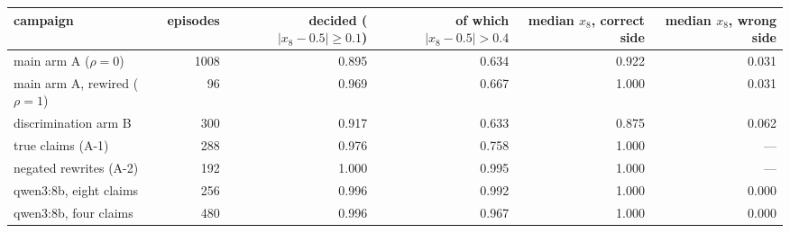 \begin{tabular}{lrrrrr}
\toprule
campaign & episodes & decided ($|x_8-0.5|\ge 0.1$) & of which $|x_8-0.5|>0.4$ & median $x_8$, correct side & median $x_8$, wrong side \\
\midrule
main arm A ($\rho=0$) & 1008 & 0.895 & 0.634 & 0.922 & 0.031 \\
main arm A, rewired ($\rho=1$) & 96 & 0.969 & 0.667 & 1.000 & 0.031 \\
discrimination arm B & 300 & 0.917 & 0.633 & 0.875 & 0.062 \\
true claims (A-1) & 288 & 0.976 & 0.758 & 1.000 & --- \\
negated rewrites (A-2) & 192 & 1.000 & 0.995 & 1.000 & --- \\
qwen3:8b, eight claims & 256 & 0.996 & 0.992 & 1.000 & 0.000 \\
qwen3:8b, four claims & 480 & 0.996 & 0.967 & 1.000 & 0.000 \\
\bottomrule
\end{tabular}
